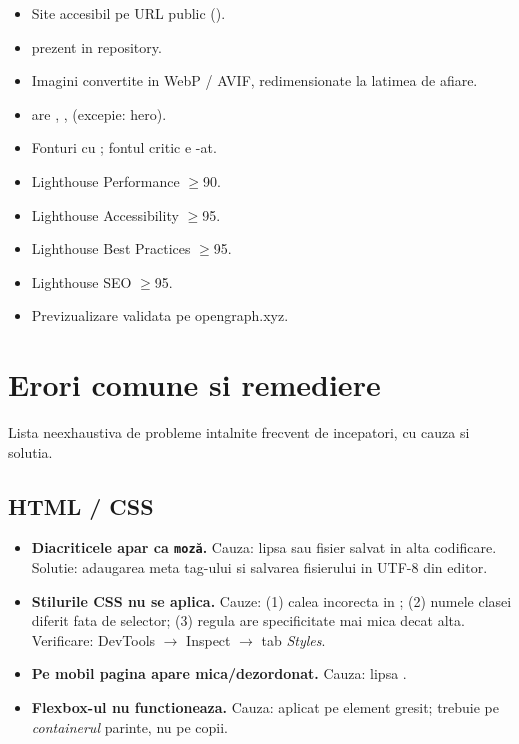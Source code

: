 \begin{itemize}[leftmargin=*, label={$\square$}, itemsep=2pt]
  \item Site accesibil pe URL public ().
  \item {} prezent in repository.
  \item Imagini convertite in WebP / AVIF, redimensionate la latimea de afiare.
  \item {} are , ,  (excepie: hero).
  \item Fonturi cu ; fontul critic e -at.
  \item Lighthouse Performance $\geq$90.
  \item Lighthouse Accessibility $\geq$95.
  \item Lighthouse Best Practices $\geq$95.
  \item Lighthouse SEO $\geq$95.
  \item Previzualizare validata pe opengraph.xyz.
\end{itemize}

\section{Erori comune si remediere}

Lista neexhaustiva de probleme intalnite frecvent de incepatori, cu cauza si solutia.

\subsection*{HTML / CSS}

\begin{itemize}[itemsep=4pt]
  \item \textbf{Diacriticele apar ca \texttt{moz\u a}.} Cauza: lipsa  sau fisier salvat in alta codificare. Solutie: adaugarea meta tag-ului si salvarea fisierului in UTF-8 din editor.
  \item \textbf{Stilurile CSS nu se aplica.} Cauze: (1) calea  incorecta in ; (2) numele clasei diferit fata de selector; (3) regula are specificitate mai mica decat alta. Verificare: DevTools $\to$ Inspect $\to$ tab \emph{Styles}.
  \item \textbf{Pe mobil pagina apare mica/dezordonat.} Cauza: lipsa .
  \item \textbf{Flexbox-ul nu functioneaza.} Cauza:  aplicat pe element gresit; trebuie pe \emph{containerul} parinte, nu pe copii.
\end{itemize}

